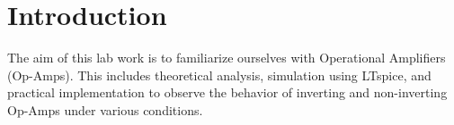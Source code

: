 \chapter{Introduction}

The aim of this lab work is to familiarize ourselves with Operational Amplifiers (Op-Amps). This includes theoretical analysis, simulation using LTspice, and practical implementation to observe the behavior of inverting and non-inverting Op-Amps under various conditions.
